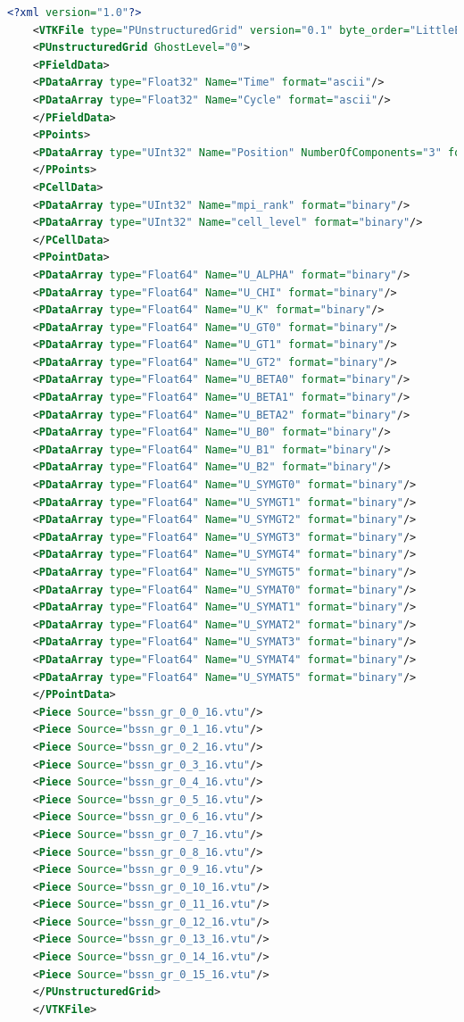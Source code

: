 \begin{lstlisting}[language=Xml,basicstyle=\tiny]
    <?xml version="1.0"?>
    <VTKFile type="PUnstructuredGrid" version="0.1" byte_order="LittleEndian">
    <PUnstructuredGrid GhostLevel="0">
    <PFieldData>
    <PDataArray type="Float32" Name="Time" format="ascii"/>
    <PDataArray type="Float32" Name="Cycle" format="ascii"/>
    </PFieldData>
    <PPoints>
    <PDataArray type="UInt32" Name="Position" NumberOfComponents="3" format="binary"/>
    </PPoints>
    <PCellData>
    <PDataArray type="UInt32" Name="mpi_rank" format="binary"/>
    <PDataArray type="UInt32" Name="cell_level" format="binary"/>
    </PCellData>
    <PPointData>
    <PDataArray type="Float64" Name="U_ALPHA" format="binary"/>
    <PDataArray type="Float64" Name="U_CHI" format="binary"/>
    <PDataArray type="Float64" Name="U_K" format="binary"/>
    <PDataArray type="Float64" Name="U_GT0" format="binary"/>
    <PDataArray type="Float64" Name="U_GT1" format="binary"/>
    <PDataArray type="Float64" Name="U_GT2" format="binary"/>
    <PDataArray type="Float64" Name="U_BETA0" format="binary"/>
    <PDataArray type="Float64" Name="U_BETA1" format="binary"/>
    <PDataArray type="Float64" Name="U_BETA2" format="binary"/>
    <PDataArray type="Float64" Name="U_B0" format="binary"/>
    <PDataArray type="Float64" Name="U_B1" format="binary"/>
    <PDataArray type="Float64" Name="U_B2" format="binary"/>
    <PDataArray type="Float64" Name="U_SYMGT0" format="binary"/>
    <PDataArray type="Float64" Name="U_SYMGT1" format="binary"/>
    <PDataArray type="Float64" Name="U_SYMGT2" format="binary"/>
    <PDataArray type="Float64" Name="U_SYMGT3" format="binary"/>
    <PDataArray type="Float64" Name="U_SYMGT4" format="binary"/>
    <PDataArray type="Float64" Name="U_SYMGT5" format="binary"/>
    <PDataArray type="Float64" Name="U_SYMAT0" format="binary"/>
    <PDataArray type="Float64" Name="U_SYMAT1" format="binary"/>
    <PDataArray type="Float64" Name="U_SYMAT2" format="binary"/>
    <PDataArray type="Float64" Name="U_SYMAT3" format="binary"/>
    <PDataArray type="Float64" Name="U_SYMAT4" format="binary"/>
    <PDataArray type="Float64" Name="U_SYMAT5" format="binary"/>
    </PPointData>
    <Piece Source="bssn_gr_0_0_16.vtu"/>
    <Piece Source="bssn_gr_0_1_16.vtu"/>
    <Piece Source="bssn_gr_0_2_16.vtu"/>
    <Piece Source="bssn_gr_0_3_16.vtu"/>
    <Piece Source="bssn_gr_0_4_16.vtu"/>
    <Piece Source="bssn_gr_0_5_16.vtu"/>
    <Piece Source="bssn_gr_0_6_16.vtu"/>
    <Piece Source="bssn_gr_0_7_16.vtu"/>
    <Piece Source="bssn_gr_0_8_16.vtu"/>
    <Piece Source="bssn_gr_0_9_16.vtu"/>
    <Piece Source="bssn_gr_0_10_16.vtu"/>
    <Piece Source="bssn_gr_0_11_16.vtu"/>
    <Piece Source="bssn_gr_0_12_16.vtu"/>
    <Piece Source="bssn_gr_0_13_16.vtu"/>
    <Piece Source="bssn_gr_0_14_16.vtu"/>
    <Piece Source="bssn_gr_0_15_16.vtu"/>
    </PUnstructuredGrid>
    </VTKFile> 
    \end{lstlisting}
    

